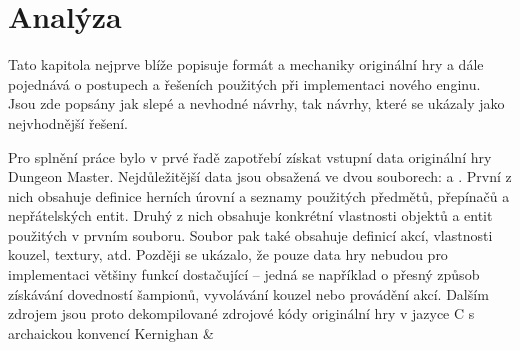 \chapter{Analýza}\label{analysis}

Tato kapitola nejprve blíže popisuje formát a mechaniky originální hry a dále pojednává o postupech a řešeních použitých 
při implementaci nového enginu. Jsou zde popsány jak slepé a nevhodné návrhy, tak návrhy, které se ukázaly 
jako nejvhodnější řešení.

Pro splnění práce bylo v prvé řadě zapotřebí získat vstupní data originální hry Dungeon Master. Nejdůležitější data 
jsou obsažená ve dvou souborech:  a . První z nich obsahuje definice herních úrovní a seznamy 
použitých předmětů, přepínačů a nepřátelských entit. Druhý z nich obsahuje konkrétní vlastnosti objektů a entit použitých v prvním souboru. 
Soubor  pak také obsahuje definicí akcí, vlastnosti kouzel, textury, atd. Později se ukázalo, že pouze data hry nebudou
pro implementaci většiny funkcí dostačující -- jedná se například o přesný způsob získávání dovedností šampionů, 
vyvolávání kouzel nebo provádění akcí. Dalším zdrojem jsou proto dekompilované zdrojové kódy \cite{DMDecompilation} originální hry v jazyce C s archaickou konvencí Kernighan \&
